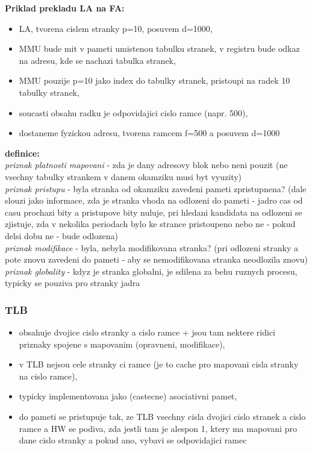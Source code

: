 \documentclass[a4paper, 11pt]{article}
\begin{document}
\textbf{Priklad prekladu LA na FA:}
\begin{itemize}
    \item LA, tvorena cislem stranky p=10, posuvem d=1000,
    \item MMU bude mit v pameti umistenou tabulku stranek, v registru bude odkaz na adresu, kde se nachazi tabulka stranek,
    \item MMU pouzije p=10 jako index do tabulky stranek, pristoupi na radek 10 tabulky stranek,
    \item soucasti obsahu radku je odpovidajici cislo ramce (napr. 500),
    \item dostaneme fyzickou adresu, tvorena ramcem f=500 a posuvem d=1000 \\
\end{itemize}

\textbf{definice:} \\[0.5em]
\textit{priznak platnosti mapovani} - zda je dany adresovy blok nebo neni pouzit (ne vsechny tabulky strankem v danem okamziku musi byt vyuzity) \\[0.2em]
\textit{priznak pristupu} - byla stranka od okamziku zavedeni pameti zpristupnena? (dale slouzi jako informace, zda je stranka vhoda na odlozeni do pameti - jadro cas od casu prochazi bity a pristupove bity nuluje, pri hledani kandidata na odlozeni se zjistuje, zda v nekolika periodach bylo ke strance pristoupeno nebo ne - pokud delsi dobu ne - bude odlozena) \\[0.2em]
\textit{priznak modifikace} - byla, nebyla modifikovana stranka? (pri odlozeni stranky a pote znovu zavedeni do pameti - aby se nemodifikovana stranka neodlozila znovu) \\[0.2em]
\textit{priznak globality} - kdyz je stranka globalni, je sdilena za behu ruznych procesu, typicky se pouziva pro stranky jadra \\

\subsubsection{TLB}
\begin{itemize}
    \item obsahuje dvojice cislo stranky a cislo ramce + jsou tam nektere ridici priznaky spojene s mapovanim (opravneni, modifikace),
    \item v TLB nejsou cele stranky ci ramce (je to cache pro mapovani cisla stranky na cislo ramce),
    \item typicky implementovana jako (castecne) asociativni pamet,
    \item do pameti se pristupuje tak, ze TLB vsechny cisla dvojici cislo stranek a cislo ramce a HW se podiva, zda jestli tam je alespon 1, ktery ma mapovani pro dane cislo stranky a pokud ano, vybavi se odpovidajici ramec \\
\end{itemize}
\end{document}

